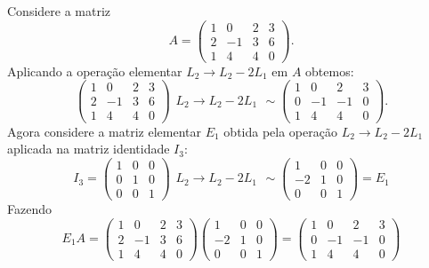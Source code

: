 \begin{exemplo}
    Considere a matriz
    \[
        A = \begin{pmatrix}
            1 & 0 & 2 & 3\\
            2 & -1 & 3 & 6\\
            1 & 4 & 4 & 0
        \end{pmatrix}.
    \]
    Aplicando a operação elementar $L_2 \to L_2 - 2L_1$ em $A$ obtemos:
    \[
        \begin{pmatrix}
            1 & 0 & 2 & 3\\
            2 & -1 & 3 & 6\\
            1 & 4 & 4 & 0
        \end{pmatrix}
        \begin{array}{l}
            \phantom{x}\\L_2 \to L_2 - 2L_1\\\phantom{x}
        \end{array}\sim
        \begin{pmatrix}
            1 & 0 & 2 & 3\\
            0 & -1 & -1 & 0\\
            1 & 4 & 4 & 0
        \end{pmatrix}.
    \]
    Agora considere a matriz elementar $E_1$ obtida pela operação $L_2 \to L_2 - 2L_1$ aplicada na matriz identidade $I_3$:
    \[
        I_3 = \begin{pmatrix}
            1 & 0 & 0\\
            0 & 1 & 0\\
            0 & 0 & 1
        \end{pmatrix}
        \begin{array}{l}
            \phantom{x}\\L_2 \to L_2 - 2L_1\\\phantom{x}
        \end{array}\sim
        \begin{pmatrix}
            1 & 0 & 0\\
            -2 & 1 & 0\\
            0 & 0 & 1
        \end{pmatrix} = E_1
    \]
    Fazendo
    \[
        E_1A = \begin{pmatrix}
            1 & 0 & 2 & 3\\
            2 & -1 & 3 & 6\\
            1 & 4 & 4 & 0
        \end{pmatrix}
        \begin{pmatrix}
            1 & 0 & 0\\
            -2 & 1 & 0\\
            0 & 0 & 1
        \end{pmatrix} =
        \begin{pmatrix}
            1 & 0 & 2 & 3\\
            0 & -1 & -1 & 0\\
            1 & 4 & 4 & 0
        \end{pmatrix}
    \]
\end{exemplo}

